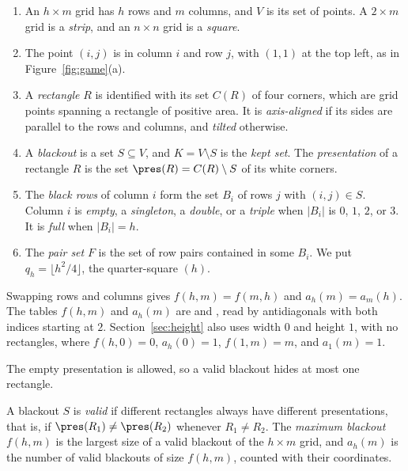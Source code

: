 \begin{enumerate}[(1),leftmargin=*]
\item An $h\times m$ grid has $h$ rows and $m$ columns, and $V$ is its set of points.
A $2\times m$ grid is a \emph{strip}, and an $n\times n$ grid is a \emph{square}.
\item The point $(i,j)$ is in column $i$ and row $j$, with $(1,1)$ at the top left, as in
Figure~\ref{fig:game}(a).
\item A \emph{rectangle} $R$ is identified with its set $C(R)$ of four corners, which are
grid points spanning a rectangle of positive area. It is \emph{axis-aligned} if its sides
are parallel to the rows and columns, and \emph{tilted} otherwise.
\item A \emph{blackout} is a set $S\subseteq V$, and $K=V\setminus S$ is the
\emph{kept set}. The \emph{presentation} of a rectangle $R$ is the set
$\pres(R)=C(R)\setminus S$ of its white corners.
\item The \emph{black rows} of column $i$ form the set $B_i$ of rows $j$ with
$(i,j)\in S$. Column $i$ is \emph{empty}, a \emph{singleton}, a \emph{double}, or a
\emph{triple} when $|B_i|$ is $0$, $1$, $2$, or $3$. It is \emph{full} when $|B_i|=h$.
\item The \emph{pair set} $F$ is the set of row pairs contained in some $B_i$. We put
$q_h=\lfloor h^2/4\rfloor$, the quarter-square $(h)$.
\end{enumerate}

Swapping rows and columns gives $f(h,m)=f(m,h)$ and $a_h(m)=a_m(h)$. The tables
$f(h,m)$ and $a_h(m)$ are  and , read by antidiagonals
with both indices starting at $2$. Section~\ref{sec:height} also uses width $0$ and height $1$, with no
rectangles, where $f(h,0)=0$, $a_h(0)=1$, $f(1,m)=m$, and $a_1(m)=1$.

The empty presentation is allowed, so a valid blackout hides at most one rectangle.

\begin{definition}\label{def:valid}
A blackout $S$ is \emph{valid} if different rectangles always have different
presentations, that is, if $\pres(R_1)\ne\pres(R_2)$ whenever $R_1\ne R_2$. The
\emph{maximum blackout} $f(h,m)$ is the largest size of a valid blackout of the
$h\times m$ grid, and $a_h(m)$ is the number of valid blackouts of size $f(h,m)$, counted
with their coordinates.
\end{definition}

